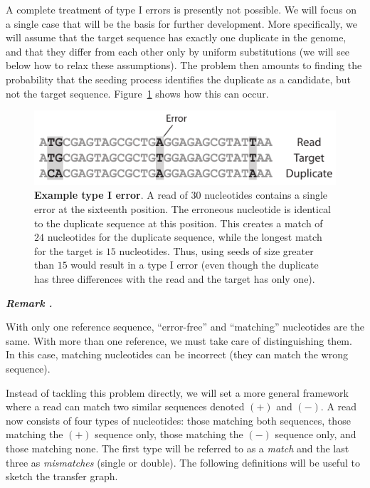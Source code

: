 \documentclass{article}
\newcounter{remarkcounter}
\newenvironment{remark}
{\small\it\vspace{0.5\baselineskip}
  \refstepcounter{remarkcounter}%
  \noindent\textbf{Remark \arabic{remarkcounter}.}%
}{\vspace{0.5\baselineskip}}
\begin{document}
A complete treatment of type I errors is presently not possible. We will
focus on a single case that will be the basis for further development.
More specifically, we will assume that the target sequence has exactly one
duplicate in the genome, and that they differ from each other only by
uniform substitutions (we will see below how to relax these assumptions).
The problem then amounts to finding the probability that the seeding
process identifies the duplicate as a candidate, but not the target
sequence. Figure~\ref{fig:example_typeI} shows how this can occur.

\begin{figure}[h]
\centering
\includegraphics[scale=1]{example_typeI.pdf}
\caption{\textbf{Example type I error}. A read of $30$ nucleotides
contains a single error at the sixteenth position. The erroneous
nucleotide is identical to the duplicate sequence at this position. This
creates a match of $24$ nucleotides for the duplicate sequence, while the
longest match for the target is $15$ nucleotides. Thus, using seeds of
size greater than $15$ would result in a type I error (even though the
duplicate has three differences with the read and the target has only
one).}
\label{fig:example_typeI}
\end{figure}

\begin{remark}
With only one reference sequence, ``error-free'' and ``matching''
nucleotides are the same. With more than one reference, we must take care
of distinguishing them. In this case, matching nucleotides can be
incorrect (they can match the wrong sequence).
\end{remark}

Instead of tackling this problem directly, we will set a more general
framework where a read can match two similar sequences denoted $(+)$ and
$(-)$. A read now consists of four types of nucleotides: those matching
both sequences, those matching the $(+)$ sequence only, those matching the
$(-)$ sequence only, and those matching none. The first type will be
referred to as a \emph{match} and the last three as \emph{mismatches}
(single or double). The following definitions will be useful to sketch
the transfer graph.
\end{document}
